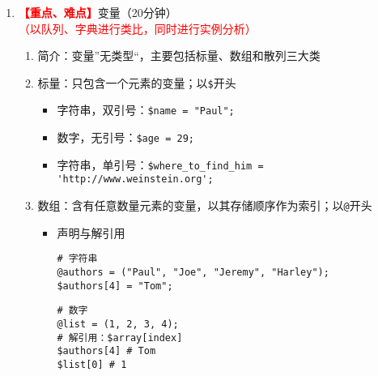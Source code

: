\documentclass{TIJMUjiaoanLL}
\begin{document}
\begin{enumerate}
\begin{enumerate}
\begin{multicols}{2}
\begin{itemize}
\begin{verbatim}
use strict;
use warnings;

print "Hello World!\n";
\end{verbatim}
	  \item 运行方法
\begin{verbatim}
# Step 1：编写脚本
vim hello.pl
# Step 2：修改权限
chmod 755 hello.pl
# Step 3：运行脚本
./hello.pl
\end{verbatim}
	\end{itemize}
	    \end{multicols}
	\vspace*{-10pt}
    \end{enumerate}

  \item \textcolor{red}{\textbf{【重点、难点】}}变量（20分钟）\textcolor{red}{（以队列、字典进行类比，同时进行实例分析）}
    \begin{enumerate}
      \item 简介：变量”无类型“，主要包括标量、数组和散列三大类
      \item 标量：只包含一个元素的变量；以\verb|$|开头
	\begin{itemize}
	  \item 字符串，双引号：\verb|$name = "Paul";|
	  \item 数字，无引号：\verb|$age = 29;|
	  \item 字符串，单引号：\verb|$where_to_find_him = 'http://www.weinstein.org';|
	\end{itemize}
      \item 数组：含有任意数量元素的变量，以其存储顺序作为索引；以\verb|@|开头
	\begin{itemize}
	  \item 声明与解引用

\vspace*{-3pt}
\begin{verbatim}
# 字符串
@authors = ("Paul", "Joe", "Jeremy", "Harley");
$authors[4] = "Tom";
\end{verbatim}
\vspace*{-3pt}
\vspace*{-10pt}
\begin{figure}[h]
\end{figure}
\vspace*{-10pt}
\vspace*{-3pt}
\begin{verbatim}
# 数字
@list = (1, 2, 3, 4);
# 解引用：$array[index]
$authors[4] # Tom
$list[0] # 1
\end{verbatim}
\vspace*{-3pt}


\end{itemize}
\end{enumerate}
\end{enumerate}
\end{document}
